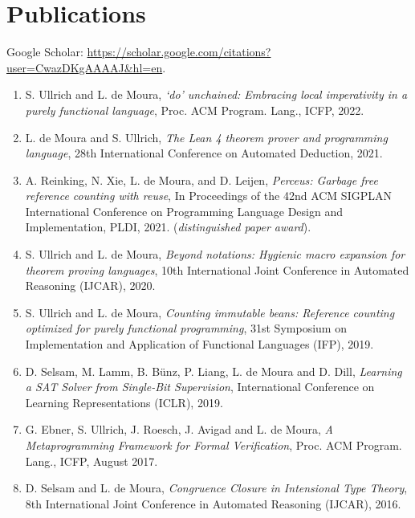 \documentclass{article}
\begin{document}
\section*{Publications}

Google Scholar: \url{https://scholar.google.com/citations?user=CwazDKgAAAAJ&hl=en}.

\begin{enumerate}

\item S. Ullrich and L. de Moura,
      {\em ‘do’ unchained: Embracing local imperativity in a purely functional language},
      Proc. ACM Program. Lang., ICFP, 2022.

\item L. de Moura and S. Ullrich,
      {\em The Lean 4 theorem prover and programming language},
      28th International Conference on Automated Deduction, 2021.

\item A. Reinking, N. Xie, L. de Moura, and D. Leijen,
      {\em Perceus: Garbage free reference counting with reuse},
      In Proceedings of the 42nd ACM SIGPLAN International Conference on Programming Language Design and Implementation, PLDI, 2021. ({\em distinguished paper award}).

\item S. Ullrich and L. de Moura,
      {\em Beyond notations: Hygienic macro expansion for theorem proving languages},
      10th International Joint Conference in Automated Reasoning (IJCAR), 2020.

\item S. Ullrich and L. de Moura,
      {\em Counting immutable beans: Reference counting optimized for purely functional programming},
      31st Symposium on Implementation and Application of Functional Languages (IFP), 2019.

\item D. Selsam, M. Lamm, B. Bünz, P. Liang, L. de Moura and D. Dill,
      {\em Learning a SAT Solver from Single-Bit Supervision},
      International Conference on Learning Representations (ICLR), 2019.

\item G. Ebner, S. Ullrich, J. Roesch, J. Avigad and L. de Moura,
      {\em A Metaprogramming Framework for Formal Verification},
      Proc. ACM Program. Lang., ICFP, August 2017.

\item D. Selsam and L. de Moura,
      {\em Congruence Closure in Intensional Type Theory},
8th International Joint Conference in Automated Reasoning (IJCAR), 2016.


\end{enumerate}
\end{document}
